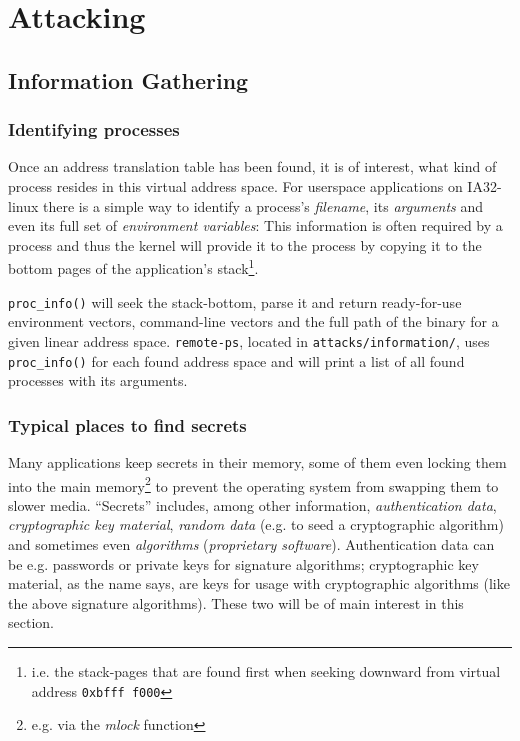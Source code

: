 %
%

\section{Attacking}




\subsection{Information Gathering}

\subsubsection{Identifying processes}

Once an address translation table has been found, it is of interest, what kind
of process resides in this virtual address space.  For userspace applications on
IA32-linux there is a simple way to identify a process's \emph{filename}, its
\emph{arguments} and even its full set of \emph{environment variables}: This
information is often required by a process and thus the kernel will provide it
to the process by copying it to the bottom pages of the application's
stack\footnote{i.e.  the stack-pages that are found first when seeking downward
from virtual address \texttt{0xbfff~f000}}.

\texttt{proc\_info()} will seek the stack-bottom, parse it and return
ready-for-use environment vectors, command-line vectors and the full path of the
binary for a given linear address space. \texttt{remote-ps}, located in
\texttt{attacks/information/}, uses \texttt{proc\_info()} for each found address
space and will print a list of all found processes with its arguments.


\subsubsection{Typical places to find secrets}

Many applications keep secrets in their memory, some of them even locking them
into the main memory\footnote{e.g. via the \emph{mlock} function} to prevent the
operating system from swapping them to slower media. ``Secrets'' includes, among
other information, \emph{authentication data}, \emph{cryptographic key
material}, \emph{random data} (e.g. to seed a cryptographic algorithm) and
sometimes even \emph{algorithms} (\emph{proprietary software}). Authentication
data can be e.g.  passwords or private keys for signature algorithms;
cryptographic key material, as the name says, are keys for usage with
cryptographic algorithms (like the above signature algorithms). These two will
be of main interest in this section.

